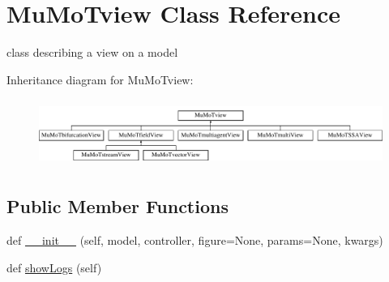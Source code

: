 \hypertarget{class_mu_mo_t_1_1_mu_mo_tview}{}\section{Mu\+Mo\+Tview Class Reference}
\label{class_mu_mo_t_1_1_mu_mo_tview}


class describing a view on a model  


Inheritance diagram for Mu\+Mo\+Tview\+:\begin{figure}[H]
\begin{center}
\leavevmode
\includegraphics[height=2.225166cm]{class_mu_mo_t_1_1_mu_mo_tview}
\end{center}
\end{figure}
\subsection*{Public Member Functions}
\begin{DoxyCompactItemize}
\item 
def \hyperlink{class_mu_mo_t_1_1_mu_mo_tview_a367325b3bd7ca4a7b7ec4107f9aa6a16}{\+\_\+\+\_\+init\+\_\+\+\_\+} (self, model, controller, figure=None, params=None, kwargs)
\item 
def \hyperlink{class_mu_mo_t_1_1_mu_mo_tview_aca4d648d909f4722c7e07197675500bb}{show\+Logs} (self)
\end{DoxyCompactItemize}
